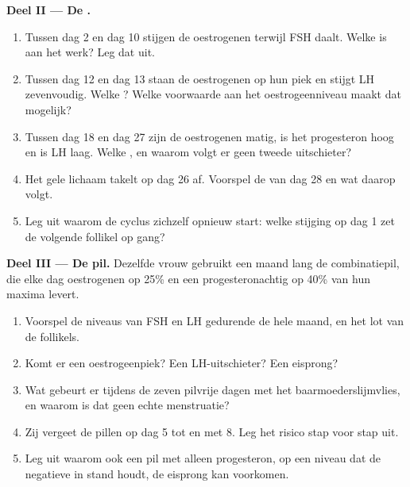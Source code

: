 \begin{problem}
\medskip
\noindent\textbf{Deel II --- De .}
\begin{enumerate}[resume]
  \item Tussen dag 2 en dag 10 stijgen de oestrogenen terwijl FSH daalt.
        Welke  is aan het werk? Leg dat uit.
  \item Tussen dag 12 en dag 13 staan de oestrogenen op hun piek en
        stijgt LH zevenvoudig. Welke ? Welke voorwaarde
        aan het oestrogeenniveau maakt dat mogelijk?
  \item Tussen dag 18 en dag 27 zijn de oestrogenen matig, is het
        progesteron hoog en is LH laag. Welke , en waarom
        volgt er geen tweede uitschieter?
  \item Het gele lichaam takelt op dag 26 af. Voorspel de  van
        dag 28 en wat daarop volgt.
  \item Leg uit waarom de cyclus zichzelf opnieuw start: welke stijging
        op dag 1 zet de volgende follikel op gang?
\end{enumerate}

\medskip
\noindent\textbf{Deel III --- De pil.}
Dezelfde vrouw gebruikt een maand lang de combinatiepil, die elke dag
oestrogenen op 25\% en een progesteronachtig  op 40\% van hun
maxima levert.
\begin{enumerate}[resume]
  \item Voorspel de niveaus van FSH en LH gedurende de hele maand, en het
        lot van de follikels.
  \item Komt er een oestrogeenpiek? Een LH-uitschieter? Een eisprong?
  \item Wat gebeurt er tijdens de zeven pilvrije dagen met het
        baarmoederslijmvlies, en waarom is dat geen echte menstruatie?
  \item Zij vergeet de pillen op dag 5 tot en met 8. Leg het risico stap
        voor stap uit.
  \item Leg uit waarom ook een pil met alleen progesteron, op een niveau
        dat de negatieve  in stand houdt, de eisprong kan
        voorkomen.
\end{enumerate}


\end{problem}
